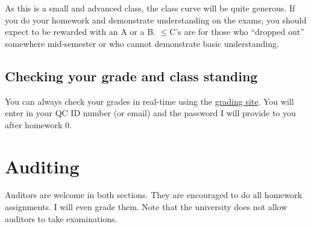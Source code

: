 \documentclass[12pt]{article}
\newcommand{\qu}[1]{``#1''}
\begin{document}
As this is a small and advanced class, the class curve will be quite generous. If you do your homework and demonstrate understanding on the exams, you should expect to be rewarded with an A or a B. $\leq$C's are for those who \qu{dropped out} somewhere mid-semester or who cannot demonstrate basic understanding.

\subsection*{Checking your grade and class standing}

You can always check your grades in real-time using the \href{http://gradesly.com}{grading site}. You will enter in your QC ID number (or email) and the password I will provide to you after homework 0.

\section*{Auditing}

Auditors are welcome in both sections. They are encouraged to do all homework assignments. I will even grade them. Note that the university does not allow auditors to take examinations.
\end{document}
